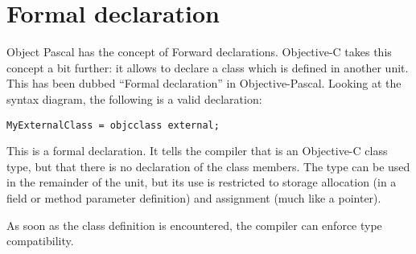 \section{Formal declaration}
Object Pascal has the concept of Forward declarations. Objective-C takes
this concept a bit further: it allows to declare a class which is defined in
another unit. This has been dubbed ``Formal declaration'' in Objective-Pascal.
Looking at the syntax diagram, the following is a valid declaration:
\begin{verbatim}
MyExternalClass = objcclass external;
\end{verbatim}
This is a formal declaration. It tells the compiler that
 is an Objective-C class type, but that there is no
declaration of the class members. The type can be used in the remainder of
the unit, but its use is restricted to storage allocation (in a field or
method parameter definition) and assignment (much like a pointer).

As soon as the class definition is encountered, the compiler can enforce
type compatibility.

